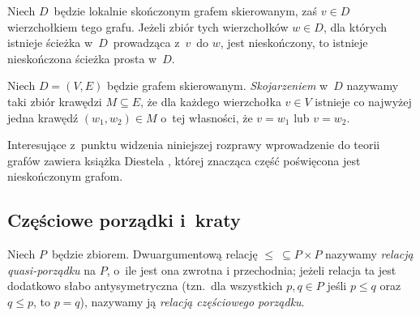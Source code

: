 \begin{lem}\label{konig}
Niech $D$~będzie lokalnie skończonym grafem skierowanym, zaś $v\in D$ wierzchołkiem tego grafu. Jeżeli zbiór tych wierzchołków $w\in D$, dla których istnieje ścieżka w~$D$~prowadząca z~$v$~do $w$, jest nieskończony, to istnieje nieskończona ścieżka prosta w~$D$.
\end{lem}

Niech $D=(V,E)$ będzie grafem skierowanym. \textit{Skojarzeniem} w~$D$ nazywamy taki zbiór krawędzi $M\subseteq E$, że dla każdego wierzchołka $v\in V$ istnieje co najwyżej jedna krawędź $(w_1,w_2)\in M$ o~tej własności, że $v=w_1$ lub $v=w_2$.

Interesujące z~punktu widzenia niniejszej rozprawy wprowadzenie do teorii grafów zawiera książka Diestela \cite{Diestel10}, której znacząca część poświęcona jest nieskończonym grafom.







\subsection{Częściowe porządki i~kraty}
Niech $P$~będzie zbiorem. Dwuargumentową relację $\leq\ \subseteq P\times P$ nazywamy \textit{relacją quasi-porządku} na $P$, o~ile jest ona zwrotna i przechodnia; jeżeli relacja ta jest dodatkowo słabo antysymetryczna (tzn.~dla wszystkich $p,q\in P$ jeśli $p\leq q$ oraz $q\leq p$, to $p=q$), nazywamy ją \textit{relacją częściowego porządku}.

